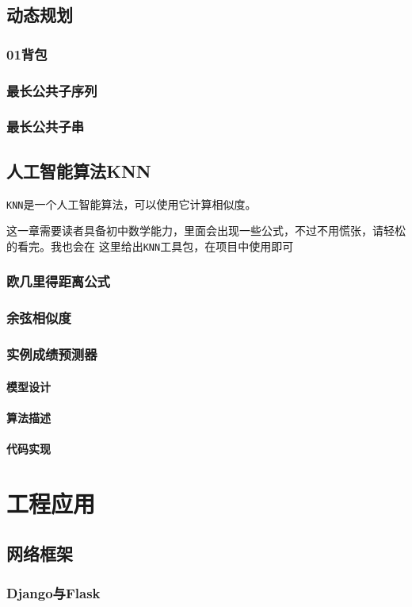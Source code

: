 \documentclass{book}
\begin{document}
\chapter{动态规划}
\section{01背包}
\section{最长公共子序列}
\section{最长公共子串}
\chapter{人工智能算法KNN}
\indent \verb|KNN|是一个人工智能算法，可以使用它计算相似度。


这一章需要读者具备初中数学能力，里面会出现一些公式，不过不用慌张，请轻松的看完。我也会在
这里给出\verb|KNN|工具包，在项目中使用即可
\section{欧几里得距离公式}
\section{余弦相似度}
\section{实例成绩预测器}
\subsection{模型设计}
\subsection{算法描述}
\subsection{代码实现}
\part{工程应用}
\chapter{网络框架}
\section{Django与Flask}
\end{document}
